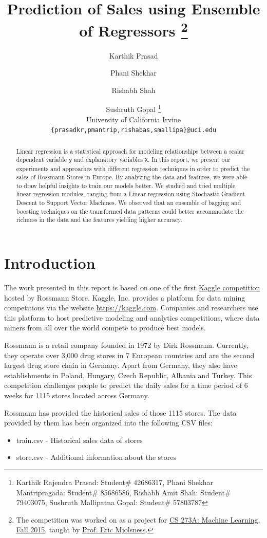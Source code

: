 \documentclass[12pt,a4paper]{article}
\title{Prediction of Sales using Ensemble of Regressors
	\footnote{The competition was worked on as a project for \href{https://eee.uci.edu/15f/35370}{CS 273A: Machine Learning, Fall 2015}, taught by \href{http://emj.ics.uci.edu/}{Prof. Eric Mjolsness}.}
}
\author{
Karthik Prasad\and Phani Shekhar\and Rishabh Shah\and Sushruth Gopal
\vspace{2mm}
\footnote{Karthik Rajendra Prasad: Student\# 42686317, Phani Shekhar Mantripragada: Student\# 85686586, Rishabh Amit Shah: Student\# 79403075, Sushruth Mallipatna Gopal: Student\# 57803787}\\
  University of California Irvine\\
  \texttt{\{prasadkr,pmantrip,rishabas,smallipa\}@uci.edu}
}
\date{}
\begin{document}
\maketitle

\begin{abstract}
	\noindent
	Linear regression is a statistical approach for modeling relationships between a scalar dependent variable \texttt{y} and explanatory variables \texttt{X}. In this report, we present our experiments and approaches with different regression techniques in order to predict the sales of Rossmann Stores in Europe. By analyzing the data and features, we were able to draw helpful insights to train our models better. We studied and tried multiple linear regression modules, ranging from a Linear regression using Stochastic Gradient Descent to Support Vector Machines. We observed that an ensemble of bagging and boosting techniques on the transformed data patterns could better accommodate the richness in the data and the features yielding higher accuracy.
\end{abstract}

\section{Introduction}
The work presented in this report is based on one of the first \href{https://www.kaggle.com/c/rossmann-store-sales}{Kaggle competition} hosted by Rossmann Store. Kaggle, Inc. provides a platform for data mining competitions via the website \href{https://kaggle.com}{\url{https://kaggle.com}}. Companies and researchers use this platform to host  predictive modeling and analytics competitions, where data miners from all over the world compete to produce best models.
	
Rossmann\cite{RossmannWiki} is a retail company founded in 1972 by Dirk Rossmann. Currently, they operate over 3,000 drug stores in 7 European countries and are the second largest drug store chain in Germany\cite{RossmannKaggle}. Apart from Germany, they also have establishments in Poland, Hungary, Czech Republic, Albania and Turkey. This competition challenges people to predict the daily sales for a time period of 6 weeks for 1115 stores located across Germany.

Rossmann has provided the historical sales of those 1115 stores\cite{RossmannData}. The data provided by them has been organized into the following CSV files:

\begin{itemize}
	\item train.csv - Historical sales data of stores
	\item store.csv - Additional information about the stores
\end{itemize}
\end{document}
